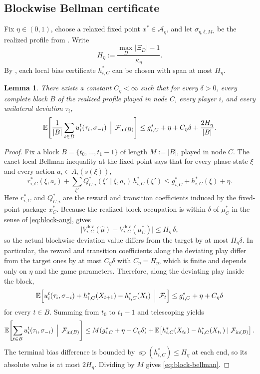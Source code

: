 \documentclass[12pt]{article}
\newtheorem{lemma}[theorem]{Lemma}
\theoremstyle{definition}
\newcommand{\E}{\mathbb{E}}
\newcommand{\1}{\mathbf{1}}
\newcommand{\cA}{\mathcal{A}}
\DeclareMathOperator{\spn}{sp}
\begin{document}
\subsection{Blockwise Bellman certificate}

Fix \(\eta\in(0,1)\), choose a relaxed fixed point \(x^*\in \cA_\eta\), and let
\(\sigma_{\eta,\delta,M_*}\) be the realized profile from .  Write
\[
H_\eta:=\frac{\max_D|\Xi_D|-1}{\kappa_\eta}.
\]
By , each local bias certificate \(h_{i,C}^*\) can be chosen with
span at most \(H_\eta\).

\begin{lemma}
\label{lem:block-bellman}
There exists a constant \(C_\eta<\infty\) such that for every \(\delta>0\), every complete
block \(B\) of the realized profile played in node \(C\), every player \(i\), and every
unilateral deviation \(\tau_i\),
\begin{equation}
\label{eq:block-bellman}
\E\!\left[
\frac1{|B|}\sum_{t\in B} u_i^t(\tau_i,\sigma_{-i})
\,\Bigm|\, \mathcal F_{\mathrm{in}(B)}
\right]
\le
g_{i,C}^*+\eta+C_\eta\delta+\frac{2H_\eta}{|B|}.
\end{equation}
\end{lemma}

\begin{proof}
Fix a block \(B=\{t_0,\dots,t_1-1\}\) of length \(M:=|B|\), played in node \(C\).  The
exact local Bellman inequality at the fixed point says that for every phase-state
\(\xi\) and every action \(a_i\in A_i(s(\xi))\),
\[
r_{i,C}^*(\xi,a_i)+\sum_{\xi'}Q_{C,i}^*(\xi' \mid \xi,a_i)\,h_{i,C}^*(\xi')
\le
g_{i,C}^*+h_{i,C}^*(\xi)+\eta.
\]
Here \(r_{i,C}^*\) and \(Q_{C,i}^*\) are the reward and transition coefficients induced by
the fixed-point package \(x_C^*\).  Because the realized block occupation is within
\(\delta\) of \(\bar\mu_C^*\) in the sense of \eqref{eq:block-aug},  gives
\[
\bigl|V^{\mathrm{dev}}_{i,C}(\widehat\mu)-V^{\mathrm{dev}}_{i,C}(\mu_C^*)\bigr|
\le H_\eta\,\delta,
\]
so the actual blockwise deviation value differs from the target by at most \(H_\eta\delta\).
In particular, the reward and transition coefficients along the deviating play differ from the target ones by at most \(C_\eta\delta\) with \(C_\eta=H_\eta\), which is finite and depends only on \(\eta\) and the game parameters.  Therefore, along the deviating play inside the block,
\[
\E\!\left[
u_i^t(\tau_i,\sigma_{-i})
+h_{i,C}^*(X_{t+1})-h_{i,C}^*(X_t)
\,\Bigm|\, \mathcal F_t
\right]
\le
g_{i,C}^*+\eta+C_\eta\delta
\]
for every \(t\in B\).  Summing from \(t_0\) to \(t_1-1\) and telescoping yields
\[
\E\!\left[
\sum_{t\in B}u_i^t(\tau_i,\sigma_{-i})
\,\Bigm|\, \mathcal F_{\mathrm{in}(B)}
\right]
\le
M(g_{i,C}^*+\eta+C_\eta\delta)
+
\E\!\left[h_{i,C}^*(X_{t_0})-h_{i,C}^*(X_{t_1})\mid \mathcal F_{\mathrm{in}(B)}\right].
\]
The terminal bias difference is bounded by \(\spn(h_{i,C}^*)\le H_\eta\) at each end, so
its absolute value is at most \(2H_\eta\).  Dividing by \(M\) gives
\eqref{eq:block-bellman}.
\end{proof}
\end{document}
